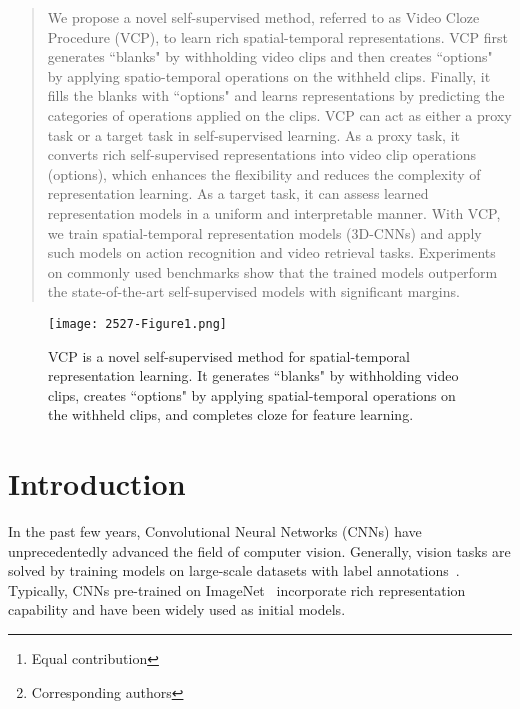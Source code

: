 \documentclass[letterpaper]{article}
\author{
Dezhao Luo,\textsuperscript{\rm 1,\rm 2}\thanks{Equal contribution}
Chang Liu,\textsuperscript{\rm 3}\footnotemark[1] 
Yu Zhou,\textsuperscript{\rm 1}\thanks{Corresponding authors} 
Dongbao Yang,\textsuperscript{\rm 1} 
Can Ma,\textsuperscript{\rm 1} 
Qixiang Ye,\textsuperscript{\rm 3}\footnotemark[2] 
Weiping Wang\textsuperscript{\rm 1}\\\\
\textsuperscript{1}{Institute of Information Engineering, Chinese Academy of Sciences}\\
\textsuperscript{2}{School of Cyber Security, University of Chinese Academy of Sciences}\\
\textsuperscript{3}{University of Chinese Academy of Sciences}\\
\{luodezhao,zhouyu,yangdongbao,macan,wangweiping\}@iie.ac.cn\\
 liuchang615@mails.ucas.ac.cn, qxye@ucas.ac.cn
}
\begin{document}
\maketitle

\begin{abstract}

We propose a novel self-supervised method, referred to as Video Cloze Procedure (VCP), to learn rich spatial-temporal representations. 
VCP first generates ``blanks" by withholding video clips and then creates ``options" by applying spatio-temporal operations on the withheld clips. Finally, it fills the blanks with ``options" and learns representations by predicting the categories of operations applied on the clips. 
VCP can act as either a proxy task or a target task in self-supervised learning. 
As a proxy task, it converts rich self-supervised representations into video clip operations (options), which enhances the flexibility and reduces the complexity of representation learning.
As a target task, it can assess learned representation models in a uniform and interpretable manner.
With VCP, we train spatial-temporal representation models (3D-CNNs) and apply such models on action recognition and video retrieval tasks.
Experiments on commonly used benchmarks show that the trained models outperform the state-of-the-art self-supervised models with significant margins.  
\end{abstract}




\begin{figure}[!t]
\centering
\texttt{[image: 2527-Figure1.png]}
\caption{VCP is a novel self-supervised method for spatial-temporal representation learning. It generates ``blanks" by withholding video clips, creates ``options" by applying spatial-temporal operations on the withheld clips, and completes cloze for feature learning. }
\label{fig:vcp}
\end{figure}

\section{Introduction}

In the past few years, Convolutional Neural Networks (CNNs) have unprecedentedly advanced the field of computer vision. 
Generally, vision tasks are solved by training models on large-scale datasets with label annotations~\cite{kim2019self}. Typically, CNNs pre-trained on ImageNet~\cite{ImageNet16} incorporate rich representation capability and have been widely used as initial models.
\end{document}

